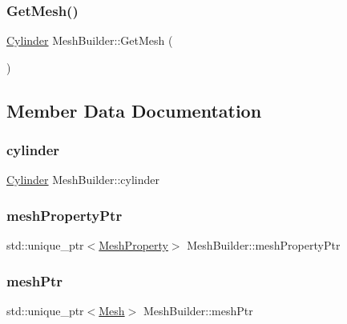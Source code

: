 \subsubsection{\texorpdfstring{GetMesh()}{GetMesh()}}
{\footnotesize\ttfamily \mbox{\hyperlink{class_cylinder}{Cylinder}} Mesh\+Builder\+::\+Get\+Mesh (\begin{DoxyParamCaption}{ }\end{DoxyParamCaption})\hspace{0.3cm}{\ttfamily [inline]}}



\subsection{Member Data Documentation}
\mbox{\label{class_mesh_builder_aba5364c12c71c36af6a83b6c3853af5b}} 
\subsubsection{\texorpdfstring{cylinder}{cylinder}}
{\footnotesize\ttfamily \mbox{\hyperlink{class_cylinder}{Cylinder}} Mesh\+Builder\+::cylinder\hspace{0.3cm}{\ttfamily [protected]}}

\mbox{\label{class_mesh_builder_a0c1493d189b81576c0740cc9a9373dc1}} 
\subsubsection{\texorpdfstring{meshPropertyPtr}{meshPropertyPtr}}
{\footnotesize\ttfamily std\+::unique\+\_\+ptr$<$\mbox{\hyperlink{class_mesh_property}{Mesh\+Property}}$>$ Mesh\+Builder\+::mesh\+Property\+Ptr}

\mbox{\label{class_mesh_builder_ad15d79cf6c25b3381e4628f77adc099a}} 
\subsubsection{\texorpdfstring{meshPtr}{meshPtr}}
{\footnotesize\ttfamily std\+::unique\+\_\+ptr$<$\mbox{\hyperlink{class_mesh}{Mesh}}$>$ Mesh\+Builder\+::mesh\+Ptr}




